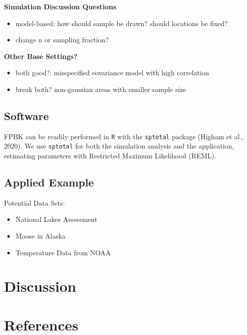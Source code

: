 \documentclass[]{elsarticle} %
\providecommand{\tightlist}{%
  \setlength{\itemsep}{0pt}\setlength{\parskip}{0pt}}
\begin{document}
\textbf{Simulation Discussion Questions}

\begin{itemize}
\tightlist
\item
  model-based: how should sample be drawn? should locations be fixed?
\item
  change n or sampling fraction?
\end{itemize}

\textbf{Other Base Settings?}

\begin{itemize}
\tightlist
\item
  both good?: misspecified covariance model with high correlation
\item
  break both? non-gaussian areas with smaller sample size
\end{itemize}

\hypertarget{software}{%
\subsection{Software}\label{software}}

FPBK can be readily performed in \texttt{R} with the \texttt{sptotal}
package (Higham et al., 2020). We use \texttt{sptotal} for both the
simulation analysis and the application, estimating parameters with
Restricted Maximum Likelihood (REML).

\hypertarget{applied-example}{%
\subsection{Applied Example}\label{applied-example}}

Potential Data Sets:

\begin{itemize}
\tightlist
\item
  National Lakes Assessment
\item
  Moose in Alaska
\item
  Temperature Data from NOAA
\end{itemize}

\hypertarget{sec:discussion}{%
\section{Discussion}\label{sec:discussion}}

\hypertarget{references}{%
\section*{References}\label{references}}
\end{document}
